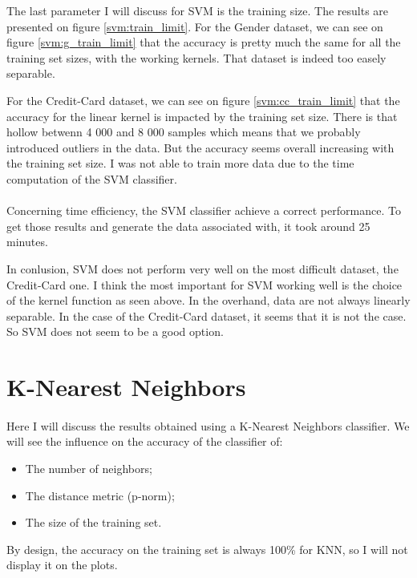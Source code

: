 \documentclass[10pt]{article}
\begin{document}
			The last parameter I will discuss for SVM is the training size. The results are presented on figure \ref{svm:train_limit}.
			For the Gender dataset, we can see on figure \ref{svm:g_train_limit} that the accuracy is pretty much the same for all the training set sizes, with the working kernels. That dataset is indeed too easely separable.

			For the Credit-Card dataset, we can see on figure \ref{svm:cc_train_limit} that the accuracy for the linear kernel is impacted by the training set size. There is that hollow betwenn 4 000 and 8 000 samples which means that we probably introduced outliers in the data. But the accuracy seems overall increasing with the training set size. I was not able to train more data due to the time computation of the SVM classifier.

		\paragraph*{}
			Concerning time efficiency, the SVM classifier achieve a correct performance. To get those results and generate the data associated with, it took around 25 minutes.

			In conlusion, SVM does not perform very well on the most difficult dataset, the Credit-Card one. I think the most important for SVM working well is the choice of the kernel function as seen above. In the overhand, data are not always linearly separable. In the case of the Credit-Card dataset, it seems that it is not the case. So SVM does not seem to be a good option.
	\section{K-Nearest Neighbors}
		\paragraph*{}
			Here I will discuss the results obtained using a K-Nearest Neighbors classifier. We will see the influence on the accuracy of the classifier of:
			\begin{itemize}
				\item The number of neighbors;
				\item The distance metric (p-norm);
				\item The size of the training set.
			\end{itemize}
			By design, the accuracy on the training set is always 100\% for KNN, so I will not display it on the plots.
\end{document}

